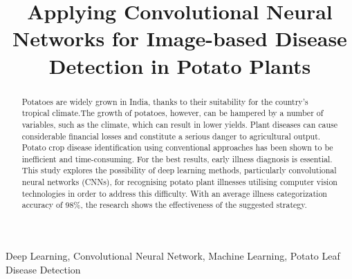 \documentclass[conference]{IEEEtran}
\begin{document}
\title{Applying Convolutional Neural Networks for Image-based Disease Detection in Potato Plants}

\author{
\and
{}
}


\maketitle

\begin{abstract}

Potatoes are widely grown in India, thanks to their suitability for the country's tropical climate.The growth of potatoes, however, can be hampered by a number of variables, such as the climate, which can result in lower yields. Plant diseases can cause considerable financial losses and constitute a serious danger to agricultural output. Potato crop disease identification using conventional approaches has been shown to be inefficient and time-consuming. For the best results, early illness diagnosis is essential. This study explores the possibility of deep learning methods, particularly convolutional neural networks (CNNs), for recognising potato plant illnesses utilising computer vision technologies in order to address this difficulty. With an average illness categorization accuracy of 98\%, the research shows the effectiveness of the suggested strategy. \\

 
\end{abstract}


\begin{IEEEkeywords}
Deep Learning, Convolutional Neural Network, Machine Learning, Potato Leaf Disease Detection 
\end{IEEEkeywords}
 
\end{document}
